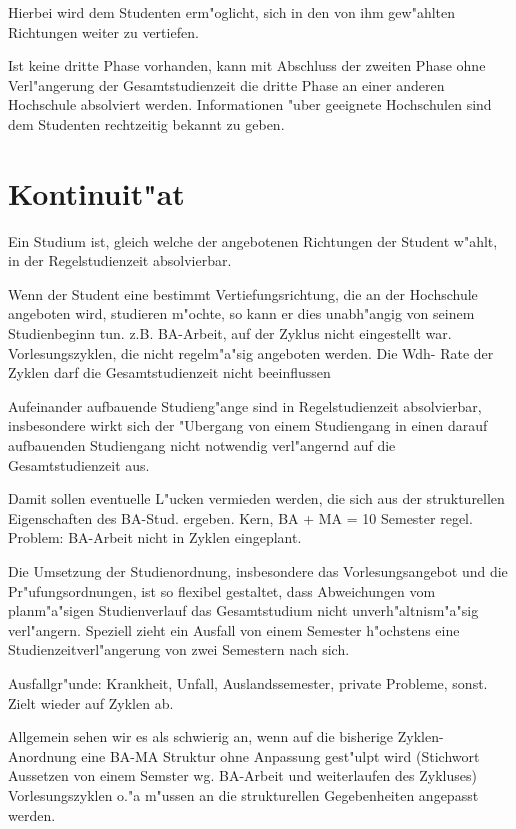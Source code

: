 Hierbei wird dem Studenten erm"oglicht, sich in den von ihm gew"ahlten Richtungen
weiter zu vertiefen.

Ist keine dritte Phase vorhanden, kann mit Abschluss der zweiten Phase ohne Verl"angerung der Gesamtstudienzeit die dritte Phase an einer anderen Hochschule absolviert werden. Informationen "uber geeignete Hochschulen sind dem Studenten rechtzeitig bekannt zu geben.


\section{Kontinuit"at}

Ein Studium ist, gleich welche der angebotenen Richtungen der Student w"ahlt, 
in der Regelstudienzeit absolvierbar.

\begin{kcmt}\begin{komacmt}
Wenn der Student eine bestimmt Vertiefungsrichtung, die an der Hochschule
angeboten wird, studieren m"ochte, so kann er dies unabh"angig von seinem Studienbeginn 
tun. z.B. BA-Arbeit, auf der Zyklus nicht eingestellt war. Vorlesungszyklen, die nicht 
regelm"a"sig angeboten werden. Die Wdh- Rate der Zyklen darf die Gesamtstudienzeit nicht beeinflussen
\end{komacmt}\end{kcmt}

Aufeinander aufbauende Studieng"ange sind in Regelstudienzeit absolvierbar,
insbesondere wirkt sich der "Ubergang von einem Studiengang in einen darauf aufbauenden Studiengang nicht notwendig verl"angernd 
auf die Gesamtstudienzeit aus.

\begin{kcmt}\begin{komacmt}
Damit sollen eventuelle L"ucken vermieden werden, die sich aus der strukturellen 
Eigenschaften des BA-Stud. ergeben. Kern, BA + MA = 10 Semester regel. Problem: 
BA-Arbeit nicht in Zyklen eingeplant.
\end{komacmt}\end{kcmt}

Die Umsetzung der Studienordnung, insbesondere das Vorlesungsangebot und die 
Pr"ufungsordnungen, ist so flexibel gestaltet, dass Abweichungen vom planm"a"sigen 
Studienverlauf das Gesamtstudium nicht unverh"altnism"a"sig verl"angern. 
Speziell zieht ein Ausfall von einem Semester h"ochstens eine Studienzeitverl"angerung 
von zwei Semestern nach sich.

\begin{kcmt}\begin{komacmt}
Ausfallgr"unde: Krankheit, Unfall, Auslandssemester, private Probleme, sonst. Zielt wieder auf Zyklen ab.


Allgemein sehen wir es als schwierig an, wenn auf die bisherige Zyklen-Anordnung eine 
BA-MA Struktur ohne Anpassung gest"ulpt wird (Stichwort Aussetzen von einem Semster 
wg. BA-Arbeit und weiterlaufen des Zykluses) Vorlesungszyklen o."a m"ussen an die 
strukturellen Gegebenheiten angepasst werden. 
\end{komacmt}\end{kcmt}

